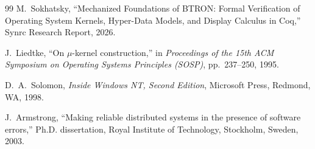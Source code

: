 \documentclass[10pt,journal,compsoc,twocolumn]{article}
\begin{document}
\begin{thebibliography}{99}
M.~Sokhatsky, ``Mechanized Foundations of BTRON: Formal Verification of Operating System Kernels, Hyper-Data Models, and Display Calculus in Coq,'' Synrc Research Report, 2026.

J.~Liedtke, ``On $\mu$-kernel construction,'' in \emph{Proceedings of the 15th ACM Symposium on Operating Systems Principles (SOSP)}, pp.~237--250, 1995.

D.~A.~Solomon, \emph{Inside Windows NT, Second Edition}, Microsoft Press, Redmond, WA, 1998.

J.~Armstrong, ``Making reliable distributed systems in the presence of software errors,'' Ph.D. dissertation, Royal Institute of Technology, Stockholm, Sweden, 2003.

\end{thebibliography}
\end{document}

